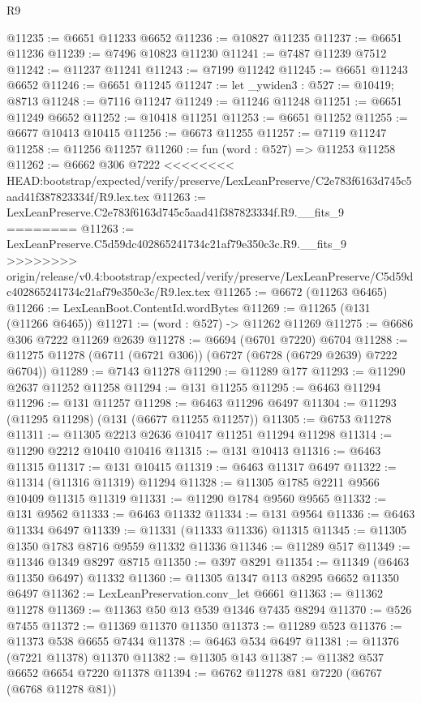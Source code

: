 \begin{lexlean}{R9}
\begin{coremodule}
{{{{{{{{{{{{{{{{{{{{{{{{{{{{{{{{{{{{{{{{{{{{{{{{{{{{{{{{{{{{{{{{{{{{{{{{{{{{{{{{{{{{@11235 := @6651 @11233 @6652
@11236 := @10827 @11235
@11237 := @6651 @11236
@11239 := @7496 @10823 @11230
@11241 := @7487 @11239 @7512
@11242 := @11237 @11241
@11243 := @7199 @11242
@11245 := @6651 @11243 @6652
@11246 := @6651 @11245
@11247 := let _ywiden3 : @527 := @10419; @8713
@11248 := @7116 @11247
@11249 := @11246 @11248
@11251 := @6651 @11249 @6652
@11252 := @10418 @11251
@11253 := @6651 @11252
@11255 := @6677 @10413 @10415
@11256 := @6673 @11255
@11257 := @7119 @11247
@11258 := @11256 @11257
@11260 := fun (word : @527) => @11253 @11258
@11262 := @6662 @306 @7222
<<<<<<<< HEAD:bootstrap/expected/verify/preserve/LexLeanPreserve/C2e783f6163d745c5aad41f387823334f/R9.lex.tex
@11263 := LexLeanPreserve.C2e783f6163d745c5aad41f387823334f.R9.__fits_9
========
@11263 := LexLeanPreserve.C5d59dc402865241734c21af79e350c3c.R9.__fits_9
>>>>>>>> origin/release/v0.4:bootstrap/expected/verify/preserve/LexLeanPreserve/C5d59dc402865241734c21af79e350c3c/R9.lex.tex
@11265 := @6672 (@11263 @6465)
@11266 := LexLeanBoot.ContentId.wordBytes
@11269 := @11265 (@131 (@11266 @6465))
@11271 := (word : @527) -> @11262 @11269
@11275 := @6686 @306 @7222 @11269 @2639
@11278 := @6694 (@6701 @7220) @6704
@11288 := @11275 @11278 (@6711 (@6721 @306)) (@6727 (@6728 (@6729 @2639) @7222 @6704))
@11289 := @7143 @11278
@11290 := @11289 @177
@11293 := @11290 @2637 @11252 @11258
@11294 := @131 @11255
@11295 := @6463 @11294
@11296 := @131 @11257
@11298 := @6463 @11296 @6497
@11304 := @11293 (@11295 @11298) (@131 (@6677 @11255 @11257))
@11305 := @6753 @11278
@11311 := @11305 @2213 @2636 @10417 @11251 @11294 @11298
@11314 := @11290 @2212 @10410 @10416
@11315 := @131 @10413
@11316 := @6463 @11315
@11317 := @131 @10415
@11319 := @6463 @11317 @6497
@11322 := @11314 (@11316 @11319) @11294
@11328 := @11305 @1785 @2211 @9566 @10409 @11315 @11319
@11331 := @11290 @1784 @9560 @9565
@11332 := @131 @9562
@11333 := @6463 @11332
@11334 := @131 @9564
@11336 := @6463 @11334 @6497
@11339 := @11331 (@11333 @11336) @11315
@11345 := @11305 @1350 @1783 @8716 @9559 @11332 @11336
@11346 := @11289 @517
@11349 := @11346 @1349 @8297 @8715
@11350 := @397 @8291
@11354 := @11349 (@6463 @11350 @6497) @11332
@11360 := @11305 @1347 @113 @8295 @6652 @11350 @6497
@11362 := LexLeanPreservation.conv_let @6661
@11363 := @11362 @11278
@11369 := @11363 @50 @13 @539 @1346 @7435 @8294
@11370 := @526 @7455
@11372 := @11369 @11370 @11350
@11373 := @11289 @523
@11376 := @11373 @538 @6655 @7434
@11378 := @6463 @534 @6497
@11381 := @11376 (@7221 @11378) @11370
@11382 := @11305 @143
@11387 := @11382 @537 @6652 @6654 @7220 @11378
@11394 := @6762 @11278 @81 @7220 (@6767 (@6768 @11278 @81))
}}}}}}}}}}}}}}}}}}}}}}}}}}}}}}}}}}}}}}}}}}}}}}}}}}}}}}}}}}}}}}}}}}}}}}}}}}}}}}}}}}}}
\end{coremodule}
\end{lexlean}
